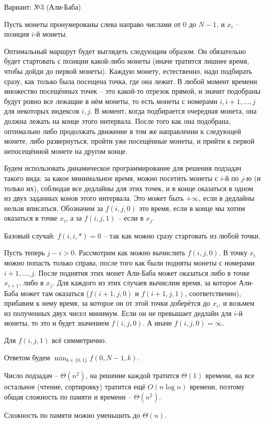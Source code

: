 \documentclass[a4paper, 12pt, onepage]{article}
\begin{document}
Вариант: №3 (Али-Баба)

Пусть монеты пронумерованы слева направо числами от $0$ до $N-1$, и $x_i$ -- позиция $i$-й монеты.

Оптимальный маршрут будет выглядеть следующим образом.
Он обязательно будет стартовать с позиции какой-либо монеты (иначе тратится лишнее время, чтобы дойди до первой монеты).
Каждую монету, естественно, надо подбирать сразу, как только была посещена точка, где она лежит.
В любой момент времени множество посещённых точек -- это какой-то отрезок прямой, и значит
подобраны будут ровно все лежащие в нём монеты, то есть монеты с номерами $i, i+1, \ldots, j$ для некоторых индексов $i, j$.
В момент, когда подбирается очередная монета, она должна лежать на конце этого интервала.
После того как она подобрана, оптимально либо продолжать движение в том же направлении к следующей монете,
либо развернуться, пройти уже посещённые монеты, и прийти к первой непосещённой монете на другом конце. 

Будем использовать динамическое программирование для решения подзадач такого вида: за какое минимальное
время, можно посетить монеты с $i$-й по $j$-ю (и только их), соблюдая все дедлайны для этих точек,
и в конце оказаться в одном из двух заданных конов этого интервала.
Это может быть $+\infty$, если в дедлайны нельзя вписаться.
Обозначим за $f(i, j, 0)$ это время, если в конце мы хотим оказаться в точке $x_i$, а за $f(i, j, 1)$ -- если в $x_j$. 

Базовый случай: $f(i, i, *) = 0$ -- так как можно сразу стартовать из любой точки.

Пусть теперь $j - i > 0$. Рассмотрим как можно вычислить $f(i, j, 0)$.
В точку $x_i$ можно попасть только справа, после того как были подняты монеты с номерами $i+1, \ldots, j$.
После поднятия этих монет Али-Баба может оказаться либо в точке $x_{i+1}$, либо в $x_j$.
Для каждого из этих случаев вычислим время, за которое Али-Баба может там оказаться
($f(i+1, j, 0)$ и $f(i+1, j, 1)$, соответственно), прибавим к нему время,
за которое он от этой точки доберётся до $x_i$, и возьмем из полученных двух чисел минимум.
Если он не превышает дедлайн для $i$-й монеты, то это и будет значением $f(i, j, 0)$.
А иначе $f(i,j,0)=\infty$.

Для $f(i,j,1)$ всё симметрично.

Ответом будем $\min_{k \in \{0, 1\}} f(0, N-1, k)$.

\bigskip

Число подзадач -- $\Theta(n^2)$, на решение каждой тратится $\Theta(1)$ времени,
на все остальное (чтение, сортировку) тратится ещё $O(n \log n)$ времени,
поэтому общая сложность по памяти и времени -- $\Theta(n^2)$.

Сложность по памяти можно уменьшить до $\Theta(n)$.
\end{document}

